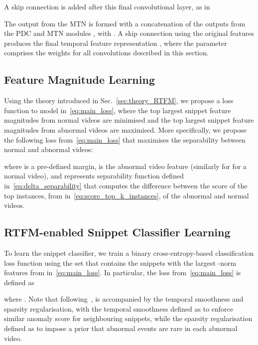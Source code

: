 \documentclass[final]{cvpr}
\begin{document}
A skip connection is added after this final  convolutional layer, as in




The output from the MTN is formed with a concatenation of the outputs from the PDC and MTN modules , with .  A skip connection using the original features  produces the final temporal feature representation ,
where the parameter  comprises the weights for all convolutions described in this section.



\subsection{Feature Magnitude Learning}
\label{sec:top_k_MIL} 


Using the theory introduced in Sec.~\ref{sec:theory_RTFM}, we propose a loss function to model  in~\eqref{eq:main_loss}, where the top  largest snippet feature magnitudes from normal videos are minimised and the top  largest snippet feature magnitudes from abnormal videos are maximised.
More specifically, we propose the following loss  from~\eqref{eq:main_loss} that maximises the separability between normal and abnormal videos:

where  is a pre-defined margin,  is the abnormal video feature (similarly for  for a normal video),
and  represents separability function defined in~\eqref{eq:delta_separability} that computes the difference between 
the score of the top  instances, from  in~\eqref{eq:score_top_k_instances}, of the abnormal and normal videos. 



\subsection{RTFM-enabled Snippet Classifier Learning}

To learn the snippet classifier, we train a binary cross-entropy-based classification loss function using the set  that contains the  snippets with the largest -norm features from  in~\eqref{eq:main_loss}.
In particular, the loss  from~\eqref{eq:main_loss} is defined as

where .
Note that following~\cite{sultani2018real},  is accompanied by the temporal smoothness and sparsity regularisation, with the temporal smoothness defined as  to enforce similar anomaly score for neighbouring snippets, while the sparsity regularisation defined as  to impose a prior that abnormal events are rare in each abnormal video.
\end{document}
